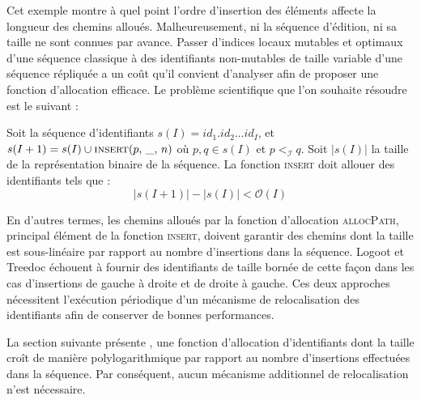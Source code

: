 Cet exemple montre à quel point l'ordre d'insertion des éléments affecte la
longueur des chemins alloués. Malheureusement, ni la séquence d'édition, ni sa
taille ne sont connues par avance.  Passer d'indices locaux mutables et optimaux
d'une séquence classique à des identifiants non-mutables de taille variable
d'une séquence répliquée a un coût qu'il convient d'analyser afin de proposer
une fonction d'allocation efficace. Le problème scientifique que l'on souhaite
résoudre est le suivant :

\begin{problem}
  Soit la séquence d'identifiants $s(I)= id_1.id_2\ldots id_I$, et
  $s(I+1) = s(I) \cup \textsc{insert}(p,\, \_,\, n)$ où $p,q \in s(I)$ et
  $p<_\mathcal{I}q$. Soit $|s(I)|$ la taille de la représentation binaire de la
  séquence. La fonction \textsc{insert} doit allouer des identifiants tels que :
  \begin{equation}
    |s(I+1)| - |s(I)| < \mathcal{O}(I)
  \end{equation}
\end{problem}

En d'autres termes, les chemins alloués par la fonction d'allocation
\textsc{allocPath}, principal élément de la fonction \textsc{insert}, doivent
garantir des chemins dont la taille est sous-linéaire par rapport au nombre
d'insertions dans la séquence. Logoot et Treedoc échouent à fournir des
identifiants de taille bornée de cette façon dans les cas d'insertions de gauche
à droite et de droite à gauche. Ces deux approches nécessitent l'exécution
périodique d'un mécanisme de relocalisation des identifiants afin de conserver
de bonnes performances.

La section suivante présente \LSEQ, une fonction d'allocation d'identifiants
dont la taille croît de manière polylogarithmique par rapport au nombre
d'insertions effectuées dans la séquence. Par conséquent, aucun mécanisme
additionnel de relocalisation n'est nécessaire.



